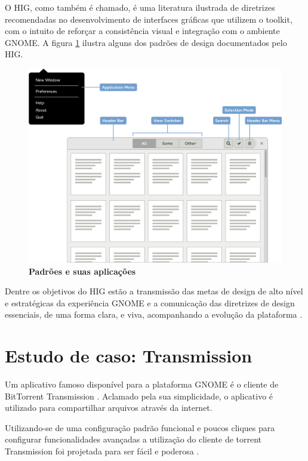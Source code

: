 O HIG, como também é chamado, é uma literatura ilustrada de diretrizes
recomendadas no desenvolvimento de interfaces gráficas que utilizem o toolkit,
com o intuito de reforçar a consistência visual e integração com o ambiente
GNOME. A figura \ref{gnome-hig-patterns} ilustra alguns dos padrões de design
documentados pelo HIG.

\begin{figure}[htb]
  \begin{center}
    \caption{\textbf{Padrões e suas aplicações}}
    \label{gnome-hig-patterns}
    \includegraphics[width=\textwidth]{image/hig/patterns.eps}
  \end{center}
\end{figure}

Dentre os objetivos do HIG estão a transmissão das metas de design de alto nível
e estratégicas da experiência GNOME e a comunicação das diretrizes de design
essenciais, de uma forma clara, e viva, acompanhando a evolução da plataforma
.

\section{Estudo de caso: Transmission}

Um aplicativo famoso disponível para a plataforma GNOME é o cliente de
BitTorrent Transmission \cite{transmission282}. Aclamado pela sua simplicidade,
o aplicativo é utilizado para compartilhar arquivos através da internet.

Utilizando-se de uma configuração padrão funcional e poucos cliques para
configurar funcionalidades avançadas a utilização do cliente de torrent
Transmission foi projetada para ser fácil e poderosa
\cite{transmission-about}.

